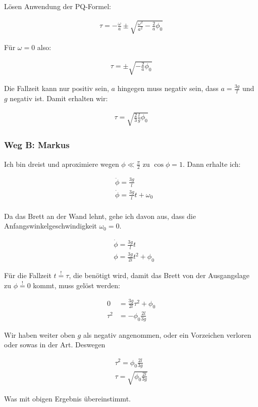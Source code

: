 \documentclass[a4paper,german,12pt,smallheadings]{scrartcl}
\begin{document}
Lösen Anwendung der PQ-Formel:

\begin{align*}
  \tau = -\frac{\omega}{a} \pm \sqrt{\frac{\omega^2}{a^2} - \frac{2}{a} \phi_0}
\end{align*}

Für $\omega = 0$ also:

\begin{align*}
  \tau = \pm \sqrt{- \frac{2}{a} \phi_0}
\end{align*}

Die Fallzeit kann nur positiv sein, $a$ hingegen muss negativ sein, dass $a = \frac{3g}{l}$ und $g$ negativ ist. Damit erhalten wir:

\begin{align*}
  \tau = \sqrt{\frac{2}{3} \frac{l}{g} \phi_0}
\end{align*}

\subsubsection*{Weg B: Markus}

Ich bin dreist und aproximiere wegen $\phi \ll \frac{\pi}{2}$ zu $\cos \phi = 1$. Dann erhalte ich:

\begin{align*}
  &\ddot{\phi} = \frac{3g}{l} \\
  &\dot{\phi} = \frac{3g}{l}t + \omega_0 \\
\end{align*}

Da das Brett an der Wand lehnt, gehe ich davon aus, dass die Anfangswinkelgeschwindigkeit $\omega_0 = 0$.

\begin{align*}
  &\dot{\phi} = \frac{3g}{l}t\\
  &\phi = \frac{3g}{2l} t^2 + \phi_0
\end{align*}

Für die Fallzeit $t \overset{!}{=} \tau$, die benötigt wird, damit das Brett von der
Ausgangslage zu $\phi \overset{!}{=} 0$ kommt, muss gelöst werden:

\begin{align*}
  0 &= \frac{3g}{2l} \tau^2 + \phi_0 \\
  \tau^2 &= -\phi_0 \frac{2l}{3g}
\end{align*}

Wir haben weiter oben $g$ als negativ angenommen, oder ein Vorzeichen verloren oder sowas in der Art. Deswegen

\begin{align*}
  \tau^2 = \phi_0 \frac{2l}{3g} \\
  \tau = \sqrt{\phi_0 \frac{2l}{3g}}
\end{align*}

Was mit obigen Ergebnis übereinstimmt.
\end{document}
